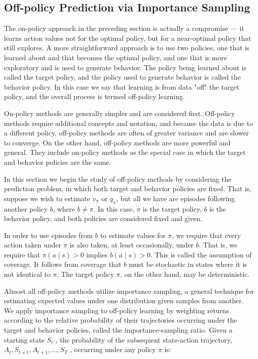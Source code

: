 \documentclass{article}
\begin{document}
\subsection{Off-policy Prediction via Importance Sampling}

The on-policy approach in the
preceding section is actually a compromise — it learns action values not for the optimal
policy, but for a near-optimal policy that still explores. A more straightforward approach
is to use two policies, one that is learned about and that becomes the optimal policy, and
one that is more exploratory and is used to generate behavior. The policy being learned
about is called the target policy, and the policy used to generate behavior is called the
behavior policy. In this case we say that learning is from data "off" the target policy, and
the overall process is termed off-policy learning.

On-policy methods are generally simpler and are considered first. Off-policy methods
require additional concepts and notation, and because the data is due to a different policy,
off-policy methods are often of greater variance and are slower to converge. On the other
hand, off-policy methods are more powerful and general. They include on-policy methods
as the special case in which the target and behavior policies are the same.

In this section we begin the study of off-policy methods by considering the prediction
problem, in which both target and behavior policies are fixed. That is, suppose we wish
to estimate \(v_{\pi}\) or \(q_{\pi}\), but all we have are episodes following another policy \(b\), where
\(b \neq \pi\). In this case, \(\pi\) is the target policy, \(b\) is the behavior policy, and both policies are
considered fixed and given.

In order to use episodes from \(b\) to estimate values for \(\pi\), we require that every action
taken under \(\pi\) is also taken, at least occasionally, under \(b\). That is, we require that
\(\pi(a \mid s) > 0\) implies \(b(a \mid s) > 0\). This is called the assumption of coverage. It follows
from coverage that \(b\) must be stochastic in states where it is not identical to \(\pi\). The
target policy \(\pi\), on the other hand, may be deterministic.

Almost all off-policy methods utilize importance sampling, a general technique for estimating expected values 
under one distribution given samples from another. We apply importance sampling to off-policy learning by weighting returns 
according to the relative probability of their trajectories occurring under the target and behavior policies, 
called the importance-sampling ratio. Given a starting state $S _ { t }$ , the probability of the subsequent state-action trajectory, 
$A _ { t } , S _ { t + 1 } , A _ { t + 1 } , \ldots , S _ { T }$ , occurring under any policy $\pi$ is:
\end{document}
